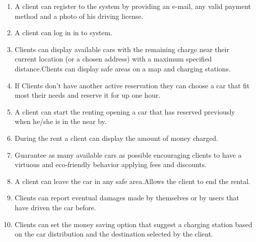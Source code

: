 \documentclass[a4paper]{article}
\begin{document}
\begin{enumerate}
\item A client can register to the system by providing an e-mail, any valid payment method and a photo of his driving license.

\item A client can log in in to system.


\item Clients can display available cars with the remaining charge near their current location (or a chosen address) with a maximum specified distance.Clients can display safe areas on a map and charging stations.

\item If Clients don’t have another active reservation they can choose a car that fit most their needs and reserve it for up one hour.

\item A client can start the renting opening a car that has reserved previously when he/she is in the near by.

\item During the rent a client can display the amount of money charged.%

\item Guarantee as many available cars as possible encouraging clients to have a virtuous and eco-friendly behavior applying fees and discounts. %

\item A client can leave the car in any safe area.Allows the client to end the rental.

\item Clients can report eventual damages made by themselves or by users that have driven the car before.

\item Clients can set the money saving option that suggest a charging station based on the car distribution and the destination selected by the client.


\end{enumerate}
\end{document}
